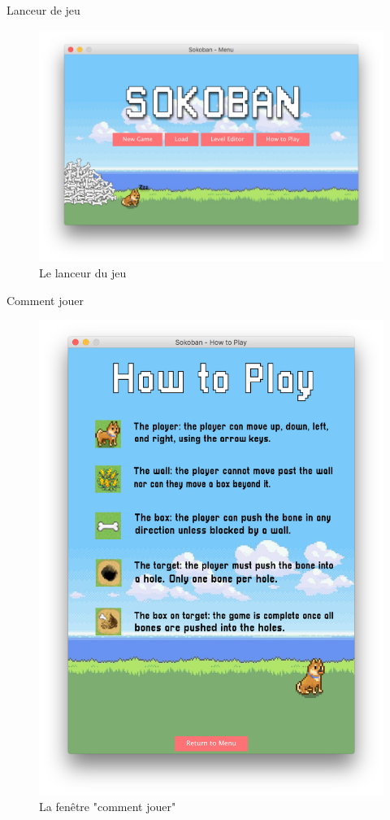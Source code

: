 \documentclass{beamer}
\begin{document}
\begin{frame}{Lanceur de jeu}
  \begin{figure}
    \includegraphics[width=.9\textwidth]{images/launcher.png}
    \vspace{-2em}
    \caption{Le lanceur du jeu}
  \end{figure}
\end{frame}

\begin{frame}{Comment jouer}
  \begin{figure}
    \includegraphics[height=.8\textheight]{images/rules.png}
    \vspace{-1em}
    \caption{La fenêtre "comment jouer"}
  \end{figure}
\end{frame}
\end{document}
